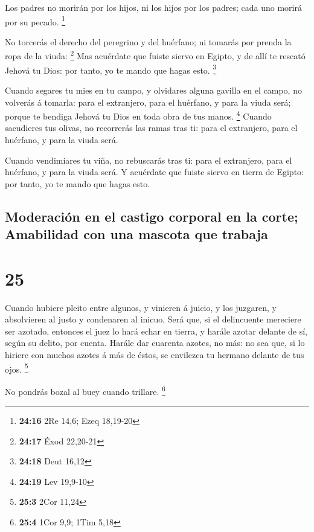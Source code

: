  Los padres no morirán por los hijos, ni los hijos por
los padres; cada uno morirá por su pecado. \footnote{\textbf{24:16} 2Re
  14,6; Ezeq 18,19-20}

 No torcerás el derecho del peregrino y del huérfano; ni
tomarás por prenda la ropa de la viuda: \footnote{\textbf{24:17} Éxod
  22,20-21}  Mas acuérdate que fuiste siervo en Egipto, y
de allí te rescató Jehová tu Dios: por tanto, yo te mando que hagas
esto. \footnote{\textbf{24:18} Deut 16,12}

 Cuando segares tu mies en tu campo, y olvidares alguna
gavilla en el campo, no volverás á tomarla: para el extranjero, para el
huérfano, y para la viuda será; porque te bendiga Jehová tu Dios en toda
obra de tus manos. \footnote{\textbf{24:19} Lev 19,9-10} 
Cuando sacudieres tus olivas, no recorrerás las ramas tras ti: para el
extranjero, para el huérfano, y para la viuda será.

 Cuando vendimiares tu viña, no rebuscarás tras ti: para
el extranjero, para el huérfano, y para la viuda será.  Y
acuérdate que fuiste siervo en tierra de Egipto: por tanto, yo te mando
que hagas esto.

\hypertarget{moderaciuxf3n-en-el-castigo-corporal-en-la-corte-amabilidad-con-una-mascota-que-trabaja}{%
\subsection{Moderación en el castigo corporal en la corte; Amabilidad
con una mascota que
trabaja}\label{moderaciuxf3n-en-el-castigo-corporal-en-la-corte-amabilidad-con-una-mascota-que-trabaja}}

\hypertarget{section-24}{%
\section{25}\label{section-24}}

 Cuando hubiere pleito entre algunos, y vinieren á juicio,
y los juzgaren, y absolvieren al justo y condenaren al inicuo,
 Será que, si el delincuente mereciere ser azotado,
entonces el juez lo hará echar en tierra, y harále azotar delante de sí,
según su delito, por cuenta.  Harále dar cuarenta azotes,
no más: no sea que, si lo hiriere con muchos azotes á más de éstos, se
envilezca tu hermano delante de tus ojos. \footnote{\textbf{25:3} 2Cor
  11,24}

 No pondrás bozal al buey cuando trillare. \footnote{\textbf{25:4}
  1Cor 9,9; 1Tim 5,18}

